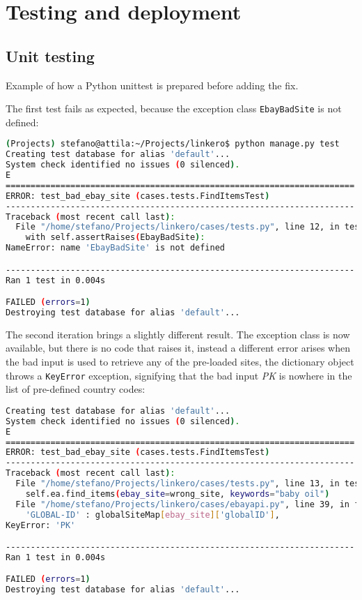 \chapter{Testing and deployment}

\section{Unit testing}

Example of how a Python unittest is prepared before adding the fix.

The first test fails as expected, because the exception class
\texttt{EbayBadSite} is not defined:
\begin{lstlisting}[language=bash, breaklines=true]
(Projects) stefano@attila:~/Projects/linkero$ python manage.py test
Creating test database for alias 'default'...
System check identified no issues (0 silenced).
E
======================================================================
ERROR: test_bad_ebay_site (cases.tests.FindItemsTest)
----------------------------------------------------------------------
Traceback (most recent call last):
  File "/home/stefano/Projects/linkero/cases/tests.py", line 12, in test_bad_ebay_site
    with self.assertRaises(EbayBadSite):
NameError: name 'EbayBadSite' is not defined

----------------------------------------------------------------------
Ran 1 test in 0.004s

FAILED (errors=1)
Destroying test database for alias 'default'...
\end{lstlisting}

The second iteration brings a slightly different result. The exception class is
now available, but there is no code that raises it, instead a different error
arises when the bad input is used to retrieve any of the pre-loaded sites, the
dictionary object throws a \texttt{KeyError} exception, signifying that the
bad input \emph{PK} is nowhere in the list of pre-defined country codes:
\begin{lstlisting}[language=bash, breaklines=true]
Creating test database for alias 'default'...
System check identified no issues (0 silenced).
E
======================================================================
ERROR: test_bad_ebay_site (cases.tests.FindItemsTest)
----------------------------------------------------------------------
Traceback (most recent call last):
  File "/home/stefano/Projects/linkero/cases/tests.py", line 13, in test_bad_ebay_site
    self.ea.find_items(ebay_site=wrong_site, keywords="baby oil")
  File "/home/stefano/Projects/linkero/cases/ebayapi.py", line 39, in find_items
    'GLOBAL-ID' : globalSiteMap[ebay_site]['globalID'],
KeyError: 'PK'

----------------------------------------------------------------------
Ran 1 test in 0.004s

FAILED (errors=1)
Destroying test database for alias 'default'...
\end{lstlisting}

